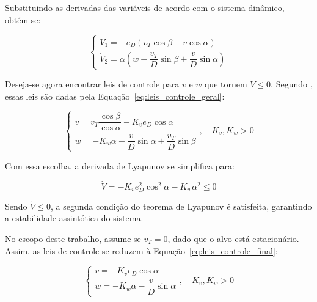 \documentclass[conference]{IEEEtran}
\begin{document}
Substituindo as derivadas das variáveis de acordo com o sistema dinâmico, obtém-se:

\begin{equation}
    \begin{cases}
        \dot{V}_1 = -e_D \left(v_T\cos\beta - v\cos\alpha\right)\\
        \dot{V}_2 = \alpha\left(w - \dfrac{v_T}{D}\sin\beta + \dfrac{v}{D}\sin\alpha\right)
    \end{cases}
    \label{eq:Derivada_Lyapunov_2_Comp}
\end{equation}

Deseja-se agora encontrar leis de controle para $v$ e $w$ que tornem $\dot{V} \leq 0$. Segundo \cite{b2}, essas leis são dadas pela Equação~\ref{eq:leis_controle_geral}:

\begin{equation}
    \begin{cases}
        v = v_T\dfrac{\cos\beta}{\cos\alpha} - K_v e_D\cos\alpha\\
        w = -K_w\alpha - \dfrac{v}{D}\sin\alpha + \dfrac{v_T}{D}\sin\beta
    \end{cases},
    \quad
    K_v, K_w > 0
    \label{eq:leis_controle_geral}
\end{equation}

Com essa escolha, a derivada de Lyapunov se simplifica para:

\begin{equation}
    \dot{V} = -K_v e_D^2 \cos^2\alpha - K_w \alpha^2 \leq 0
    \label{eq:lyapunov_neg_def}
\end{equation}

Sendo $\dot{V} \leq 0$, a segunda condição do teorema de Lyapunov é satisfeita, garantindo a estabilidade assintótica do sistema.

No escopo deste trabalho, assume-se $v_T = 0$, dado que o alvo está estacionário. Assim, as leis de controle se reduzem à Equação~\ref{eq:leis_controle_final}:

\begin{equation}
    \begin{cases}
        v = -K_v e_D \cos\alpha\\
        w = -K_w \alpha - \dfrac{v}{D} \sin\alpha
    \end{cases},
    \quad
    K_v, K_w > 0
    \label{eq:leis_controle_final}
\end{equation}

\end{document}
